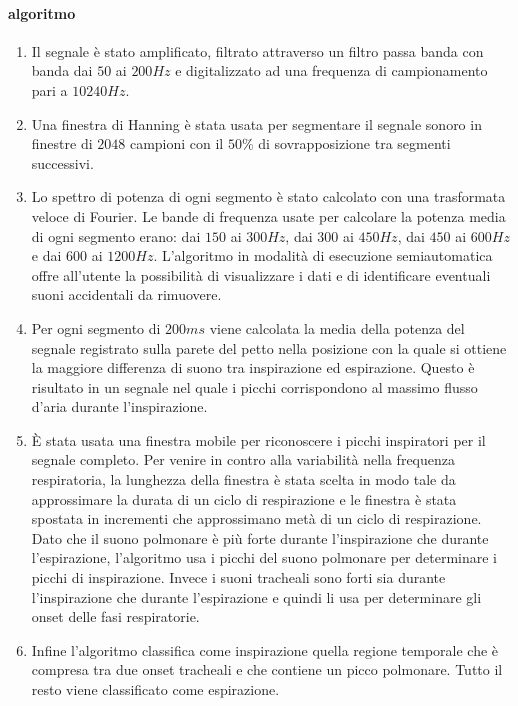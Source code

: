 \begin{frame}
    \paragraph{algoritmo}
      \begin{enumerate}
	\item
	  Il segnale \`e stato amplificato, filtrato attraverso un filtro passa banda con banda dai $50$ ai $200Hz$ e digitalizzato ad una frequenza di campionamento pari a $10240Hz$.
	\item 
	  Una finestra di Hanning \`e stata usata per segmentare il segnale sonoro in finestre di $2048$ campioni con il $50\%$ di sovrapposizione tra segmenti successivi.
	\item
	  Lo spettro di potenza di ogni segmento \`e stato calcolato con una trasformata veloce di Fourier. 
	  Le bande di frequenza usate per calcolare la potenza media di ogni segmento erano: dai $150$ ai $300Hz$, dai $300$ ai $450Hz$, dai $450$ ai $600Hz$ e dai $600$ ai $1200Hz$. 
	  L'algoritmo in modalit\`a di esecuzione semiautomatica offre all'utente la possibilit\`a di visualizzare i dati e di identificare eventuali suoni accidentali da rimuovere.
	\item
	  Per ogni segmento di $200ms$ viene calcolata la media della potenza del segnale registrato sulla parete del petto nella posizione con la quale si ottiene la maggiore differenza di suono tra inspirazione ed espirazione. 
	  Questo \`e risultato in un segnale nel quale i picchi corrispondono al massimo flusso d'aria durante l'inspirazione.
	\item
	  \`E stata usata una finestra mobile per riconoscere i picchi inspiratori per il segnale completo. 
	  Per venire in contro alla variabilit\`a nella frequenza respiratoria, la lunghezza della finestra \`e stata scelta in modo tale da approssimare la durata di un ciclo di respirazione e le finestra \`e stata spostata in incrementi che approssimano met\`a di un ciclo di respirazione. 
	  Dato che il suono polmonare \`e pi\`u forte durante l'inspirazione che durante l'espirazione, l'algoritmo usa i picchi del suono polmonare per determinare i picchi di inspirazione.
	  Invece i suoni tracheali sono forti sia durante l'inspirazione che durante l'espirazione e quindi li usa per determinare gli onset delle fasi respiratorie.
	\item
	  Infine l'algoritmo classifica come inspirazione quella regione temporale che \`e compresa tra due onset tracheali e che contiene un picco polmonare. 
	  Tutto il resto viene classificato come espirazione.
      \end{enumerate}

\end{frame}

